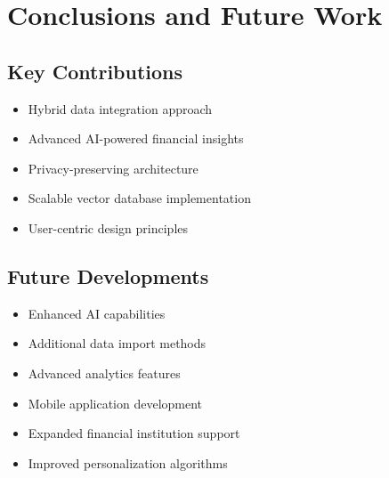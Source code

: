 \documentclass[conference]{IEEEtran}
\begin{document}
\section{Conclusions and Future Work}
\subsection{Key Contributions}
\begin{itemize}
\item Hybrid data integration approach
\item Advanced AI-powered financial insights
\item Privacy-preserving architecture
\item Scalable vector database implementation
\item User-centric design principles
\end{itemize}

\subsection{Future Developments}
\begin{itemize}
\item Enhanced AI capabilities
\item Additional data import methods
\item Advanced analytics features
\item Mobile application development
\item Expanded financial institution support
\item Improved personalization algorithms
\end{itemize}
\end{document}
